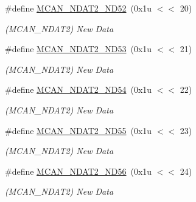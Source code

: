 \begin{DoxyCompactItemize}
\mbox{\label{group__SAMV71__MCAN_ga8dddec617649e578e878f9c5942e9ac9}} 
\#define \mbox{\hyperlink{group__SAMV71__MCAN_ga8dddec617649e578e878f9c5942e9ac9}{M\+C\+A\+N\+\_\+\+N\+D\+A\+T2\+\_\+\+N\+D52}}~(0x1u $<$$<$ 20)
\begin{DoxyCompactList}\small\item\em (M\+C\+A\+N\+\_\+\+N\+D\+A\+T2) New Data \end{DoxyCompactList}\item 
\mbox{\label{group__SAMV71__MCAN_gad4c26b9fb92fa29871b334d5d9cc9668}} 
\#define \mbox{\hyperlink{group__SAMV71__MCAN_gad4c26b9fb92fa29871b334d5d9cc9668}{M\+C\+A\+N\+\_\+\+N\+D\+A\+T2\+\_\+\+N\+D53}}~(0x1u $<$$<$ 21)
\begin{DoxyCompactList}\small\item\em (M\+C\+A\+N\+\_\+\+N\+D\+A\+T2) New Data \end{DoxyCompactList}\item 
\mbox{\label{group__SAMV71__MCAN_ga9454eca60022615f52996e6d408ebe22}} 
\#define \mbox{\hyperlink{group__SAMV71__MCAN_ga9454eca60022615f52996e6d408ebe22}{M\+C\+A\+N\+\_\+\+N\+D\+A\+T2\+\_\+\+N\+D54}}~(0x1u $<$$<$ 22)
\begin{DoxyCompactList}\small\item\em (M\+C\+A\+N\+\_\+\+N\+D\+A\+T2) New Data \end{DoxyCompactList}\item 
\mbox{\label{group__SAMV71__MCAN_ga3258bd227dd7d072d0cde766656534c2}} 
\#define \mbox{\hyperlink{group__SAMV71__MCAN_ga3258bd227dd7d072d0cde766656534c2}{M\+C\+A\+N\+\_\+\+N\+D\+A\+T2\+\_\+\+N\+D55}}~(0x1u $<$$<$ 23)
\begin{DoxyCompactList}\small\item\em (M\+C\+A\+N\+\_\+\+N\+D\+A\+T2) New Data \end{DoxyCompactList}\item 
\mbox{\label{group__SAMV71__MCAN_ga28bc1d75f8b7c4cebd081657b7fe5499}} 
\#define \mbox{\hyperlink{group__SAMV71__MCAN_ga28bc1d75f8b7c4cebd081657b7fe5499}{M\+C\+A\+N\+\_\+\+N\+D\+A\+T2\+\_\+\+N\+D56}}~(0x1u $<$$<$ 24)
\begin{DoxyCompactList}\small\item\em (M\+C\+A\+N\+\_\+\+N\+D\+A\+T2) New Data \end{DoxyCompactList}\item 
$$
\end{DoxyCompactItemize}
